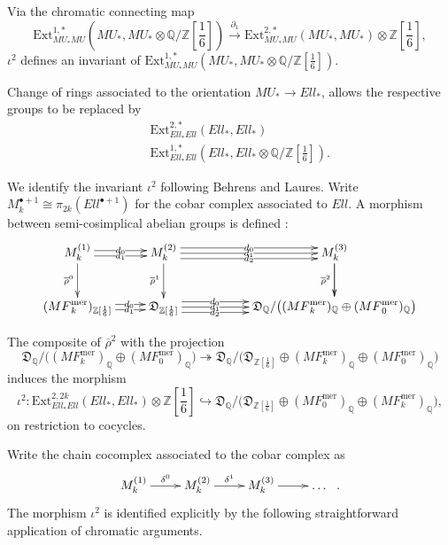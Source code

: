 \documentclass[10pt,a4paper]{amsart}
\theoremstyle{definition}
\theoremstyle{remark}
\newcommand{\qzsix}{{\rat/\zed[{\scriptstyle{\frac{1}{6}}}]}}
\newcommand{\zedsix}{{\zed[{\scriptstyle{\frac{1}{6}}}]}}
\newcommand{\divcong}{\mathfrak{D}}
\newcommand{\ext}{\mathrm{Ext}}
\newcommand{\zed}{\mathbb{Z}}
\newcommand{\rat}{\mathbb{Q}}
\newcommand{\mf}{{MF}}
\newcommand{\mfmero}{\mf^{\mathrm{mer}}}
\newcommand{\tmf}{{Ell}}
\newcommand{\tmfcoeff}{{Ell}}
\begin{document}
Via  the chromatic connecting map
\[
	\ext^{1,*}_{MU_*MU} (MU_*,MU_* \otimes \qzsix )
\stackrel{\partial_1}{\rightarrow}
 \ext^{2,*}_{MU_*MU} (MU_*,MU_* ) \otimes \zedsix,
\]
$\iota^2$ defines an invariant of
$
\ext^{1,*}_{MU_*MU} (MU_*,MU_* \otimes \qzsix ).
$

Change of rings associated to the orientation $MU_* \rightarrow \tmfcoeff_*$, allows the respective groups to be  replaced  by
\begin{eqnarray*}
&&	\ext^{2,*} _{\tmfcoeff_*\tmfcoeff} (\tmfcoeff_* , \tmfcoeff_*)
	\\
&&	\ext^{1,*}_{\tmfcoeff_*\tmfcoeff} (\tmfcoeff_*,\tmfcoeff_* \otimes \qzsix ).
\end{eqnarray*}



We identify the invariant $\iota^2$ following Behrens and Laures. Write $M_k ^{\bullet +1} \cong \pi_{2k} (\tmf^{\bullet +1})$ for the cobar complex associated to
$\tmf$. A morphism between semi-cosimplical abelian groups is defined \cite[page 25]{behrens_laures}:
\begin{eqnarray}
\label{eqn:BL_semicosimplicial}
	\xymatrix{
M_k^{(1)}
\ar@<.5ex>[r]|{d_0}
\ar@<-.5ex>[r]|{d_1}
\ar[d]
_{\overline{\rho}^0}
&
M_k^{(2)}
\ar@<1ex>[rr]|{d_0}
\ar@<0ex>[rr]|{d_1}
\ar@<-1ex>[rr]|{d_2}
\ar[d]
_{\overline{\rho}^1}
&&
M_k^{(3)}
\ar[d]
\ar[d]
_{\overline{\rho}^2}
\\
(\mfmero_k)_{\zedsix}
\ar@<.5ex>[r]|(.6){d_0}
\ar@<-.5ex>[r]|(.6){d_1}
&
\divcong_{\zedsix}
\ar@<1ex>[rr]|(.3){d_0}
\ar@<0ex>[rr]|(.3){d_1}
\ar@<-1ex>[rr]|(.3){d_2}
&&
\divcong_\rat / \big(
(\mfmero_k)_{\rat}
\oplus
(\mfmero_0)_\rat
\big)
}
\end{eqnarray}

The composite of $\overline{\rho}^2$ with the projection
\[
	\divcong_\rat / \big(
(\mfmero_k)_{\rat}
\oplus
(\mfmero_0)_\rat
\big)
\twoheadrightarrow
\divcong_\rat / \big(
\divcong_{\zedsix} \oplus (\mfmero_k)_{\rat} \oplus (\mfmero_0)_\rat
\big)
\]
induces the morphism
\[
\iota^2 : 	\ext^{2,2k} _{\tmfcoeff_*\tmfcoeff} (\tmfcoeff_* , \tmfcoeff_*) \otimes \zedsix
\hookrightarrow
\divcong _\rat / \Big(\divcong_\zedsix \oplus (\mfmero_0)_\rat \oplus
(\mfmero_{k})_\rat \Big),
\]
 on restriction to cocycles.


Write the  chain cocomplex associated to the cobar complex as
\[
	\xymatrix{
M_k^{(1)}
\ar[r]^{\delta^0}
&
M_k^{(2)}
\ar[r]^{\delta^1}
&
M_k^{(3)}
\ar[r]
&
\ldots
\ \  .
}
\]
The morphism $\iota^2$ is identified explicitly by the following straightforward application of chromatic arguments.
\end{document}
